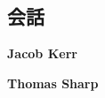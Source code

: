 \documentclass[12pt]{book}
\begin{document}
\begin{CJK}{UTF8}{min}

\newcommand{\asan}{\vspace{.5ex}\textbf{アさん}\hspace{1ex}}
\newcommand{\bsan}{\vspace{.5ex}\textbf{イさん}\hspace{1ex}}

\chapter*{\flushright 会話}
\begin{flushright}
\textbf{Jacob Kerr}
\vspace{1ex}

\textbf{Thomas Sharp}
\end{flushright}




\end{CJK}
\end{document}
